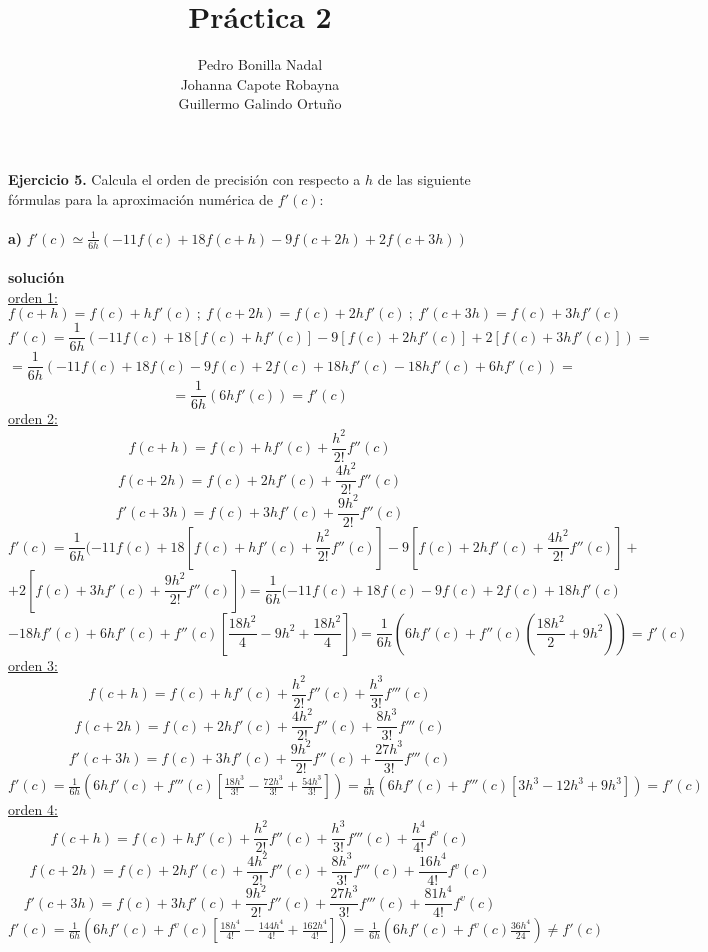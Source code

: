 \documentclass[11pt]{article}
\title{\textbf{Práctica 2}}
\author{Pedro Bonilla Nadal\\
		Johanna Capote Robayna\\
		Guillermo Galindo Ortuño}
\date{}
\begin{document}
\maketitle

\textbf{Ejercicio 5.} Calcula el orden de precisión con respecto a $h$ de las siguiente fórmulas para la aproximación numérica de $f'(c)$: \\ \\
\textbf{a)} $f'(c) \simeq \frac{1}{6h}(-11f(c) + 18f(c + h) -9f(c + 2h) +2f(c+3h))$ \\ \\
\textbf{solución} \\
\underline{orden 1:} \\
$$f(c + h) = f(c) + hf'(c) \ ; \ f(c + 2h) = f(c) + 2hf'(c) \ ; \ f'(c + 3h) = f(c) + 3hf'(c)$$
$$f'(c) = \frac{1}{6h}(-11f(c) + 18  [f(c) + hf'(c)] - 9  [f(c) + 2hf'(c)] + 2 [f(c) + 3hf'(c)]) = $$
$$= \frac{1}{6h}(-11f(c) + 18f(c) - 9f(c) + 2f(c) + 18hf'(c) - 18hf'(c) + 6hf'(c)) = $$
$$= \frac{1}{6h}(6hf'(c)) = f'(c) $$
\underline{orden 2:} \\
$$ f(c + h) = f(c) + hf'(c) + \frac{h^{2}}{2!} f''(c)$$ $$ f(c + 2h) = f(c) + 2hf'(c) + \frac{4h^{2}}{2!} f''(c)$$ $$f'(c + 3h) = f(c) + 3hf'(c) + \frac{9h^{2}}{2!} f''(c) $$
$$f'(c) = \frac{1}{6h}(-11f(c) + 18  [f(c) + hf'(c) + \frac{h^{2}}{2!} f''(c)] - 9  [f(c) + 2hf'(c) + \frac{4h^{2}}{2!} f''(c)] +$$ $$ + 2 [f(c) + 3hf'(c) + \frac{9h^{2}}{2!} f''(c)]) = \frac{1}{6h}(-11f(c) + 18f(c) - 9f(c) + 2f(c)  + 18hf'(c)  $$ $$- 18hf'(c) + 6hf'(c) + f''(c)[\frac{18h^{2}}{4} - 9h^{2} + \frac{18h^{2}}{4}]) = \frac{1}{6h}(6hf'(c) + f''(c)(\frac{18h^{2}}{2} + 9h^{2})) = f'(c)$$
\underline{orden 3:} \\
$$ f(c + h) = f(c) + hf'(c) + \frac{h^{2}}{2!} f''(c) + \frac{h^{3}}{3!}f'''(c)$$
$$ f(c + 2h) = f(c) + 2hf'(c) + \frac{4h^{2}}{2!} f''(c) + \frac{8h^{3}}{3!}f'''(c)$$ 
$$f'(c + 3h) = f(c) + 3hf'(c) + \frac{9h^{2}}{2!} f''(c) + \frac{27h^{3}}{3!}f'''(c)$$
$f'(c) = \frac{1}{6h}(6hf'(c) + f'''(c)[\frac{18h^{3}}{3!} - \frac{72h^{3}}{3!} + \frac{54h^{3}}{3!}]) =  \frac{1}{6h}(6hf'(c) + f'''(c)[3h^{3} - 12h^{3} + 9h^{3}]) = f'(c)  $ \\
\underline{orden 4:} \\
$$ f(c + h) = f(c) + hf'(c) + \frac{h^{2}}{2!} f''(c) + \frac{h^{3}}{3!}f'''(c) + \frac{h^{4}}{4!}f^{v}(c)$$
$$ f(c + 2h) = f(c) + 2hf'(c) + \frac{4h^{2}}{2!} f''(c) + \frac{8h^{3}}{3!}f'''(c) + \frac{16h^{4}}{4!}f^{v}(c)$$ 
$$f'(c + 3h) = f(c) + 3hf'(c) + \frac{9h^{2}}{2!} f''(c) + \frac{27h^{3}}{3!}f'''(c) + \frac{81h^{4}}{4!}f^{v}(c)$$
$f'(c) = \frac{1}{6h}(6hf'(c) + f^{v}(c)[\frac{18h^{4}}{4!} - \frac{144h^{4}}{4!} + \frac{162h^{4}}{4!}]) = \frac{1}{6h}(6hf'(c) + f^{v}(c)\frac{36h^{4}}{24}) \neq f'(c) $ \\
\end{document}
